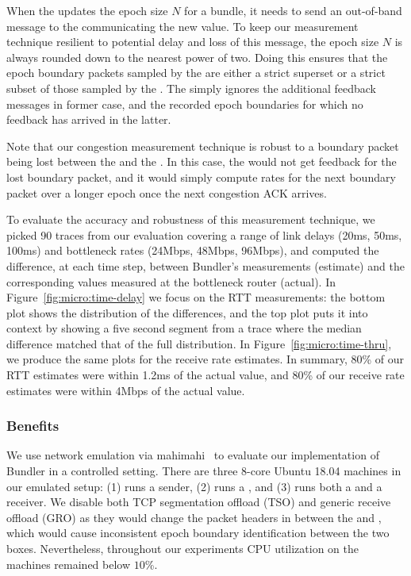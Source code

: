 When the \inbox updates the epoch size $N$ for a bundle, it needs to send an out-of-band message to the \outbox communicating the new value. To keep our measurement technique resilient to potential delay and loss of this message, the epoch size $N$ is always rounded down to the nearest power of two. Doing this ensures that the epoch boundary packets sampled by the \outbox are either a strict superset or a strict subset of those sampled by the \inbox. The \inbox simply ignores the additional feedback messages in former case, and the recorded epoch boundaries for which no feedback has arrived in the latter.  

Note that our congestion measurement technique is robust to a boundary packet being lost between the \inbox and the \outbox. In this case, the \inbox would not get feedback for the lost boundary packet, and it would simply compute rates for the next boundary packet over a longer epoch once the next congestion ACK arrives.

To evaluate the accuracy and robustness of this measurement technique, we picked 90 traces from our evaluation covering a range of link delays (20ms, 50ms, 100ms) and bottleneck rates (24Mbps, 48Mbps, 96Mbps), and computed the difference, at each time step, between Bundler's measurements (estimate) and the corresponding values measured at the bottleneck router (actual). 
In Figure~\ref{fig:micro:time-delay} we focus on the RTT measurements: the bottom plot shows the distribution of the differences, and the top plot puts it into context by showing a five second segment from a trace where the median difference matched that of the full distribution. In Figure~\ref{fig:micro:time-thru}, we produce the same plots for the receive rate estimates.
In summary, 80\% of our RTT estimates were within 1.2ms of the actual value, and 80\% of our receive rate estimates were within 4Mbps of the actual value.

\subsubsection{Benefits}\label{s:bundler:eval}

We use network emulation via mahimahi~\cite{mahimahi} to evaluate our implementation of Bundler in a controlled setting.
There are three $8$-core Ubuntu 18.04 machines in our emulated setup: (1) runs a sender, (2) runs a \inbox, and (3) runs both a \outbox and a receiver.
We disable both TCP segmentation offload (TSO) and generic receive offload (GRO) as they would change the packet headers in between the \inbox and \outbox, which would cause inconsistent epoch boundary identification between the two boxes.
Nevertheless, throughout our experiments CPU utilization on the machines remained below $10$\%.


